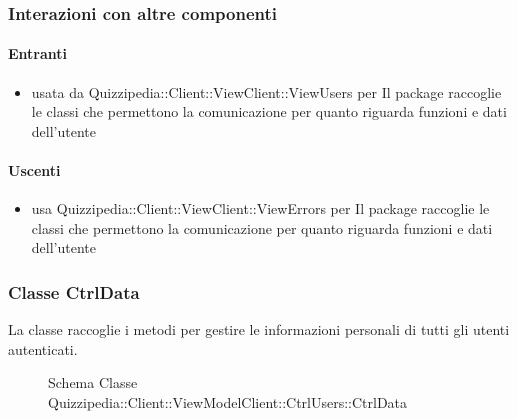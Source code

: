 \subsubsection{Interazioni con altre componenti}
\paragraph{Entranti}
\begin{itemize}
\item usata da Quizzipedia::Client::ViewClient::ViewUsers per Il package raccoglie le classi che permettono la comunicazione per quanto riguarda funzioni e dati dell'utente
\end{itemize}
\paragraph{Uscenti}
\begin{itemize}
\item usa Quizzipedia::Client::ViewClient::ViewErrors per Il package raccoglie le classi che permettono la comunicazione per quanto riguarda funzioni e dati dell'utente
\end{itemize}
\subsubsection{Classe CtrlData}
La classe raccoglie i metodi per gestire le informazioni personali di tutti gli utenti autenticati.
\begin{figure}[H]
\centering
\noindent{}
\caption[Schema Classe CtrlData]{Schema Classe Quizzipedia::Client::ViewModelClient::CtrlUsers::CtrlData}
\end{figure}
